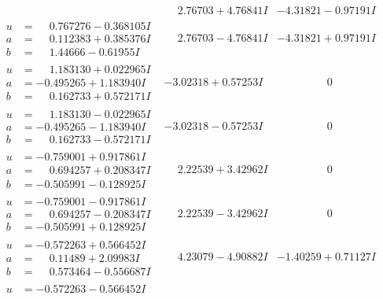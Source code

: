 \documentclass[1p]{elsarticle_modified}
\theoremstyle{definition}
\begin{document}
$$\begin{array}{c|c|c}
 & \phantom{-}2.76703 + 4.76841 I & -4.31821 - 0.97191 I \\ \hline\begin{aligned}
u &= \phantom{-}0.767276 - 0.368105 I \\
a &= \phantom{-}0.112383 + 0.385376 I \\
b &= \phantom{-}1.44666 - 0.61955 I\end{aligned}
 & \phantom{-}2.76703 - 4.76841 I & -4.31821 + 0.97191 I \\ \hline\begin{aligned}
u &= \phantom{-}1.183130 + 0.022965 I \\
a &= -0.495265 + 1.183940 I \\
b &= \phantom{-}0.162733 + 0.572171 I\end{aligned}
 & -3.02318 + 0.57253 I & \phantom{-0.000000 } 0 \\ \hline\begin{aligned}
u &= \phantom{-}1.183130 - 0.022965 I \\
a &= -0.495265 - 1.183940 I \\
b &= \phantom{-}0.162733 - 0.572171 I\end{aligned}
 & -3.02318 - 0.57253 I & \phantom{-0.000000 } 0 \\ \hline\begin{aligned}
u &= -0.759001 + 0.917861 I \\
a &= \phantom{-}0.694257 + 0.208347 I \\
b &= -0.505991 - 0.128925 I\end{aligned}
 & \phantom{-}2.22539 + 3.42962 I & \phantom{-0.000000 } 0 \\ \hline\begin{aligned}
u &= -0.759001 - 0.917861 I \\
a &= \phantom{-}0.694257 - 0.208347 I \\
b &= -0.505991 + 0.128925 I\end{aligned}
 & \phantom{-}2.22539 - 3.42962 I & \phantom{-0.000000 } 0 \\ \hline\begin{aligned}
u &= -0.572263 + 0.566452 I \\
a &= \phantom{-}0.11489 + 2.09983 I \\
b &= \phantom{-}0.573464 - 0.556687 I\end{aligned}
 & \phantom{-}4.23079 - 4.90882 I & -1.40259 + 0.71127 I \\ \hline\begin{aligned}
u &= -0.572263 - 0.566452 I \\

\end{aligned}
\end{array}$$
\end{document}
